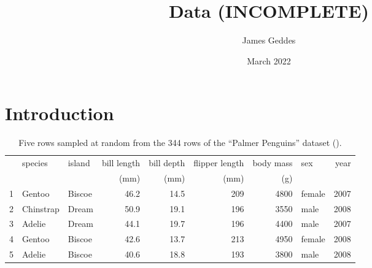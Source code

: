\documentclass[10pt, a4paper, twocolumn]{article}
\author{James Geddes}
\date{March 2022}
\title{Data (INCOMPLETE)}
\begin{document}
\maketitle
\section{Introduction}
\begin{table*}[!ht]
\centering\small
\begin{tabular}{@{}rllrrrrlr@{}}
  \toprule
 & species & island & bill length & bill depth & flipper length & body mass & sex & year \\ 
 & & & (mm) & (mm) & (mm) & (g) & &  \\ 
  \midrule
  1 & Gentoo & Biscoe & 46.2 & 14.5 & 209 & 4800 & female & 2007 \\ 
  2 & Chinstrap & Dream & 50.9 & 19.1 & 196 & 3550 & male & 2008 \\ 
  3 & Adelie & Dream & 44.1 & 19.7 & 196 & 4400 & male & 2007 \\ 
  4 & Gentoo & Biscoe & 42.6 & 13.7 & 213 & 4950 & female & 2008 \\ 
  5 & Adelie & Biscoe & 40.6 & 18.8 & 193 & 3800 & male & 2008 \\ 
  \bottomrule
\end{tabular}
\caption{Five rows sampled at random from the 344 rows of the ``Palmer Penguins''
  dataset (\cite{palmerpenguins}).\label{tbl:penguins}}
\end{table*}
\end{document}
